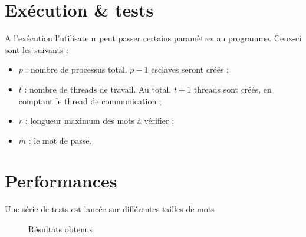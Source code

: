 \section{Exécution \& tests} %
\label{sec:execution}

A l'exécution l'utilisateur peut passer certains paramètres au programme. Ceux-ci sont les suivants :
\begin{itemize}
	\item $p$ : nombre de processus total. $p-1$ esclaves seront créés ;
	\item $t$ : nombre de threads de travail. Au total, $t+1$ threads sont créés, en comptant le thread de communication ;
	\item $r$ : longueur maximum des mots à vérifier ;
	\item $m$ : le mot de passe.
\end{itemize}


\section{Performances} %
\label{sec:perf}

Une série de tests est lancée sur différentes tailles de mots

\begin{figure}[h!]
\centering
\caption{Résultats obtenus}
\label{fig:stats}
\end{figure}


